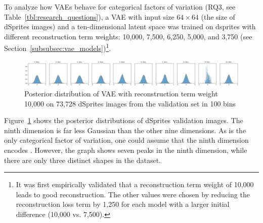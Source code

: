 To analyze how \acp{VAE} behave for categorical factors of variation (RQ3, see Table~\ref{tbl:research_questions}), a \ac{VAE} with input size $64\times 64$ (the size of dSprites images) and a ten-dimensional latent space was trained on dsprites with different reconstruction term weights: 10,000, 7,500, 6,250, 5,000, and 3,750 (see Section~\ref{subsubsec:vae_models})\footnote{It was first empirically validated that a reconstruction term weight of 10,000 leads to good reconstruction. The other values were chosen by reducing the reconstruction loss term by 1,250 for each model with a larger initial difference (10,000 vs. 7,500).}.

\begin{figure}
    \centering
    \includegraphics[width=\textwidth]{images/latent_space_entanglement/vae_dsprites_lf_10000_dist.png}
    \caption[VAE Latent Space Distribution - dSprites]{Posterior distribution of \ac{VAE} with reconstruction term weight 10,000 on 73,728 dSprites images from the validation set in 100 bins}
    \label{fig:10000_vae_latent_space_distribution}
\end{figure}

Figure~\ref{fig:10000_vae_latent_space_distribution} shows the posterior distributions of dSprites validation images.
The ninth dimension is far less Gaussian than the other nine dimensions.
As  is the only categorical factor of variation, one could assume that the ninth dimension encodes .
However, the graph shows seven peaks in the ninth dimension, while there are only three distinct shapes in the dataset.

